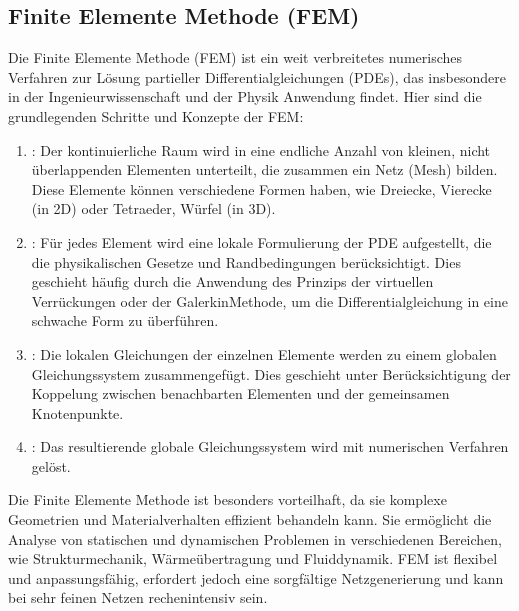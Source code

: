 \documentclass[letterpaper,10pt,german]{jupyterBook}
\begin{document}
\subsection{Finite Elemente Methode (FEM)}
\label{\detokenize{chapters/chapter1/Einf_xfchrung_Loesungsverfahren:finite-elemente-methode-fem}}
\sphinxAtStartPar
Die Finite Elemente Methode (FEM) ist ein weit verbreitetes numerisches Verfahren zur Lösung partieller Differentialgleichungen (PDEs), das insbesondere in der Ingenieurwissenschaft und der Physik Anwendung findet. Hier sind die grundlegenden Schritte und Konzepte der FEM:
\begin{enumerate}
%
\item {} 
\sphinxAtStartPar
{}: Der kontinuierliche Raum wird in eine endliche Anzahl von kleinen, nicht überlappenden Elementen unterteilt, die zusammen ein Netz (Mesh) bilden. Diese Elemente können verschiedene Formen haben, wie Dreiecke, Vierecke (in 2D) oder Tetraeder, Würfel (in 3D).

\item {} 
\sphinxAtStartPar
{}: Für jedes Element wird eine lokale Formulierung der PDE aufgestellt, die die physikalischen Gesetze und Randbedingungen berücksichtigt. Dies geschieht häufig durch die Anwendung des Prinzips der virtuellen Verrückungen oder der Galerkin\sphinxhyphen{}Methode, um die Differentialgleichung in eine schwache Form zu überführen.

\item {} 
\sphinxAtStartPar
{}: Die lokalen Gleichungen der einzelnen Elemente werden zu einem globalen Gleichungssystem zusammengefügt. Dies geschieht unter Berücksichtigung der Koppelung zwischen benachbarten Elementen und der gemeinsamen Knotenpunkte.

\item {} 
\sphinxAtStartPar
{}: Das resultierende globale Gleichungssystem wird mit numerischen Verfahren gelöst.

\end{enumerate}

\sphinxAtStartPar
Die Finite Elemente Methode ist besonders vorteilhaft, da sie komplexe Geometrien und Materialverhalten effizient behandeln kann. Sie ermöglicht die Analyse von statischen und dynamischen Problemen in verschiedenen Bereichen, wie Strukturmechanik, Wärmeübertragung und Fluiddynamik. FEM ist flexibel und anpassungsfähig, erfordert jedoch eine sorgfältige Netzgenerierung und kann bei sehr feinen Netzen rechenintensiv sein.
\end{document}
